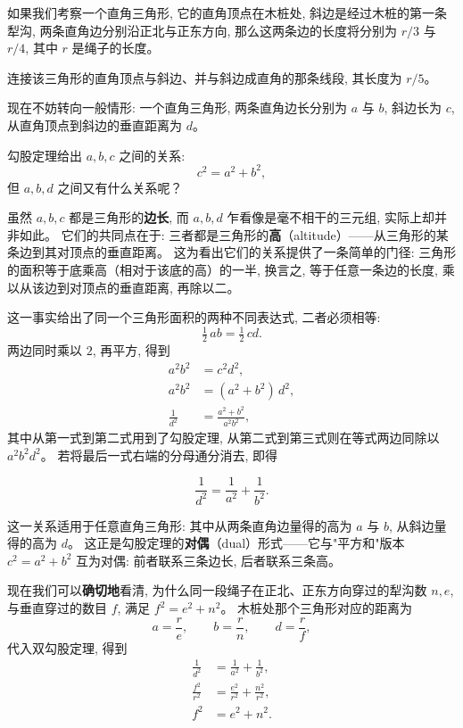 
如果我们考察一个直角三角形, 它的直角顶点在木桩处, 斜边是经过木桩的第一条犁沟,
两条直角边分别沿正北与正东方向, 那么这两条边的长度将分别为 $r/3$ 与 $r/4$,
其中 $r$ 是绳子的长度。

连接该三角形的直角顶点与斜边、并与斜边成直角的那条线段, 其长度为 $r/5$。


现在不妨转向一般情形: 一个直角三角形, 两条直角边长分别为 $a$ 与 $b$, 斜边长为 $c$,
从直角顶点到斜边的垂直距离为 $d$。

勾股定理给出 $a,b,c$ 之间的关系:
\begin{equation}
c^{2} = a^{2} + b^{2},
\end{equation}
但 $a,b,d$ 之间又有什么关系呢？

虽然 $a,b,c$ 都是三角形的\textbf{边长}, 而 $a,b,d$ 乍看像是毫不相干的三元组, 实际上却并非如此。
它们的共同点在于: 三者都是三角形的\textbf{高}（altitude）——从三角形的某条边到其对顶点的垂直距离。
这为看出它们的关系提供了一条简单的门径: 三角形的面积等于底乘高（相对于该底的高）的一半,
换言之, 等于任意一条边的长度, 乘以从该边到对顶点的垂直距离, 再除以二。

这一事实给出了同一个三角形面积的两种不同表达式, 二者必须相等:
\begin{equation}
\tfrac{1}{2}\, a b = \tfrac{1}{2}\, c d.
\end{equation}
两边同时乘以 $2$, 再平方, 得到
\begin{align}
a^{2} b^{2} &= c^{2} d^{2}, \\
a^{2} b^{2} &= (a^{2} + b^{2})\, d^{2}, \\
\frac{1}{d^{2}} &= \frac{a^{2} + b^{2}}{a^{2} b^{2}},
\end{align}
其中从第一式到第二式用到了勾股定理, 从第二式到第三式则在等式两边同除以 $a^{2} b^{2} d^{2}$。
若将最后一式右端的分母通分消去, 即得

\begin{equation}
\frac{1}{d^{2}} = \frac{1}{a^{2}} + \frac{1}{b^{2}}. \tag{Dual Pythagorean Theorem}
\end{equation}

这一关系适用于任意直角三角形: 其中从两条直角边量得的高为 $a$ 与 $b$, 从斜边量得的高为 $d$。
这正是勾股定理的\textbf{对偶}（dual）形式——它与"平方和"版本 $c^{2}=a^{2}+b^{2}$ 互为对偶:
前者联系三条边长, 后者联系三条高。

现在我们可以\textbf{确切地}看清, 为什么同一段绳子在正北、正东方向穿过的犁沟数 $n,e$,
与垂直穿过的数目 $f$, 满足 $f^{2} = e^{2} + n^{2}$。
木桩处那个三角形对应的距离为
\begin{equation}
a = \frac{r}{e}, \qquad b = \frac{r}{n}, \qquad d = \frac{r}{f},
\end{equation}
代入双勾股定理, 得到
\begin{align}
\frac{1}{d^{2}} &= \frac{1}{a^{2}} + \frac{1}{b^{2}}, \\
\frac{f^{2}}{r^{2}} &= \frac{e^{2}}{r^{2}} + \frac{n^{2}}{r^{2}}, \\
f^{2} &= e^{2} + n^{2}.
\end{align}

